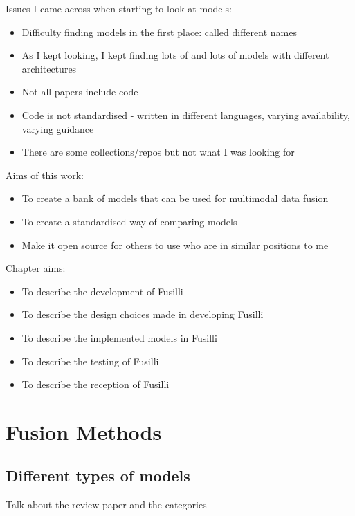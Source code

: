 Issues I came across when starting to look at models:
\begin{itemize}
    \item Difficulty finding models in the first place: called different names
    \item As I kept looking, I kept finding lots of and lots of models with different architectures   
    \item Not all papers include code
    \item Code is not standardised - written in different languages, varying availability, varying guidance
    \item There are some collections/repos but not what I was looking for
\end{itemize}

Aims of this work:
\begin{itemize}
    \item To create a bank of models that can be used for multimodal data fusion
    \item To create a standardised way of comparing models
    \item Make it open source for others to use who are in similar positions to me
\end{itemize}

Chapter aims:
\begin{itemize}
    \item To describe the development of Fusilli
    \item To describe the design choices made in developing Fusilli
    \item To describe the implemented models in Fusilli
    \item To describe the testing of Fusilli
    \item To describe the reception of Fusilli
\end{itemize}

\section{Fusion Methods}

\subsection{Different types of models}

Talk about the review paper and the categories

